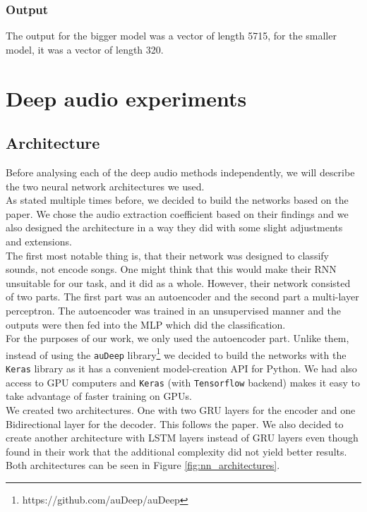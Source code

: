 \subsubsection{Output}
The output for the bigger model was a vector of length 5715, for the smaller model, it was a vector of length 320.

\section{Deep audio experiments}\label{sec:deep_audio_experiments}

\subsection{Architecture}\label{ssec:nn_architectures}
Before analysing each of the deep audio methods independently, we will describe the two neural network architectures we used. \\
As stated multiple times before, we decided to build the networks based on the \cite{inproceedings_RNNs} paper. We chose the audio extraction coefficient based on their findings and we also designed the architecture in a way they did with some slight adjustments and extensions. \\
The first most notable thing is, that their network was designed to classify sounds, not encode songs. One might think that this would make their RNN unsuitable for our task, and it did as a whole. However, their network consisted of two parts. The first part was an autoencoder and the second part a multi-layer perceptron. The autoencoder was trained in an unsupervised manner and the outputs were then fed into the MLP which did the classification. \\
For the purposes of our work, we only used the autoencoder part. Unlike them, instead of using the \texttt{auDeep} library\footnote{https://github.com/auDeep/auDeep} we decided to build the networks with the \texttt{Keras} library \cite{chollet2015keras} as it has a convenient model-creation API for Python. We had also access to GPU computers and \texttt{Keras} (with \texttt{Tensorflow} backend) makes it easy to take advantage of faster training on GPUs. \\
We created two architectures. One with two GRU layers for the encoder and one Bidirectional layer for the decoder. This follows the paper. We also decided to create another architecture with LSTM layers instead of GRU layers even though \cite{inproceedings_RNNs} found in their work that the additional complexity did not yield better results. Both architectures can be seen in Figure \ref{fig:nn_architectures}. \\ 


